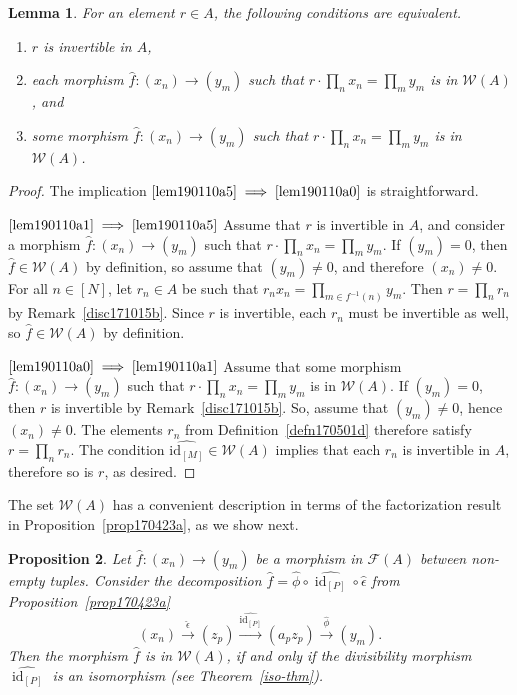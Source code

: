 \documentclass[reqno]{amsart}
\theoremstyle{plain}
\newtheorem{lem}{Lemma}[section]
\newtheorem{prop}[lem]{Proposition}
\theoremstyle{definition}
\newcommand{\cat}[1]{\mathcal{#1}}
\newcommand{\catw}{\cat{W}}
\newcommand{\catf}{\cat{F}}
\newcommand{\id}{\operatorname{id}}
\newcommand{\xra}{\xrightarrow}
\newcommand{\emptytuple}{\mathfrak{0}}
\numberwithin{equation}{lem}
\begin{document}
\begin{lem}\label{lem190110a} 
For an element $r \in A$, the following conditions are equivalent.
\begin{enumerate}[\rm(i)]
\item \label{lem190110a1}
$r$ is invertible in $A$,
\item \label{lem190110a5}
each morphism $\hat f\colon (x_n)\to (y_m)$ such that $r\cdot\prod_nx_n=\prod_my_m$ is in $\catw(A)$, and
\item \label{lem190110a0}
some morphism $\hat f\colon (x_n)\to (y_m)$ such that $r\cdot\prod_nx_n=\prod_my_m$ is in $\catw(A)$.
\end{enumerate}
\end{lem}

\begin{proof}
The implication $\eqref{lem190110a5}\implies\eqref{lem190110a0}$ is straightforward.

$\eqref{lem190110a1}\implies\eqref{lem190110a5}$
Assume that $r$ is invertible in $A$, and consider a morphism $\hat f\colon (x_n)\to (y_m)$ such that $r\cdot\prod_nx_n=\prod_my_m$.
If $(y_m)=\emptytuple$, then $\hat f\in\catw(A)$ by definition, so assume that $(y_m)\neq\emptytuple$, and therefore $(x_n)\neq\emptytuple$.
For all $n\in[N]$, let $r_n\in A$ be such that $r_nx_n =  \prod_{m \in f^{-1}(n)} y_m$.
Then $r=\prod_nr_n$ by Remark~\ref{disc171015b}.
Since $r$ is invertible, each $r_n$ must be invertible as well, so
$\hat f\in\catw(A)$ by definition.

$\eqref{lem190110a0}\implies\eqref{lem190110a1}$
Assume that some morphism $\hat f\colon (x_n)\to (y_m)$ such that $r\cdot\prod_nx_n=\prod_my_m$ is in $\catw(A)$.
If $(y_m)=\emptytuple$, then $r$ is invertible by Remark~\ref{disc171015b}.
So, assume that $(y_m)\neq\emptytuple$, hence $(x_n)\neq\emptytuple$.
The elements $r_n$ from Definition~\ref{defn170501d}  
therefore satisfy $r=\prod_nr_n$. The condition $\widehat{\text{id}_{[M]}}\in\catw(A)$ 
implies that each $r_n$ is invertible in $A$, therefore so is $r$, as desired.
\end{proof}

The
set $\mathcal W(A)$ has a convenient description
in terms of the factorization result in Proposition~\ref{prop170423a}, as we show next.


\begin{prop}\label{prop170503c}
Let $\hat f\colon(x_n)\to (y_m)$ be a morphism in $\catf(A)$ between non-empty tuples.
Consider the decomposition $\hat f=\hat\phi\circ\widehat{\id_{[P]}}\circ\hat\epsilon$ from Proposition~\ref{prop170423a}
$$(x_n)\xra{\hat\epsilon}(z_p)\xra{\widehat{\id_{[P]}}}(a_pz_p)
\xra{\hat\phi}(y_m).$$
Then 
the morphism $\hat f$ is in $\catw(A)$,
if and only if the divisibility morphism
$\widehat{\id_{[P]}}$ is an 
isomorphism (see Theorem~\ref{iso-thm}).
\end{prop}
\end{document}
